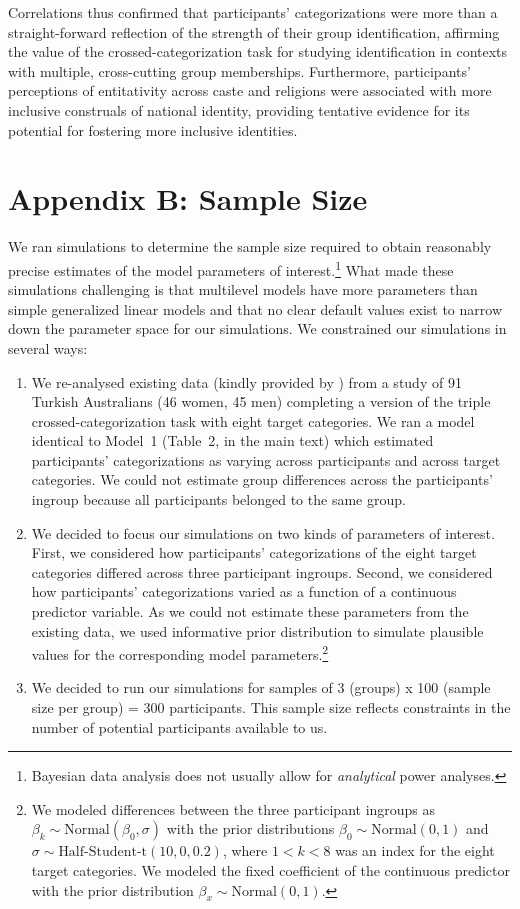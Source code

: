 \documentclass[12pt, a4paper]{article}
\begin{document}
Correlations thus confirmed that participants' categorizations were more than a straight-forward reflection of the strength of their group identification, affirming the value of the crossed-categorization task for studying identification in contexts with multiple, cross-cutting group memberships. Furthermore, participants' perceptions of entitativity across caste and religions were associated with more inclusive construals of national identity, providing tentative evidence for its potential for fostering more inclusive identities.

\newpage

\section{Appendix B: Sample Size}

We ran simulations to determine the sample size required to obtain reasonably precise estimates of the model parameters of interest.\footnote{Bayesian data analysis does not usually allow for \textit{analytical} power analyses.} What made these simulations challenging is that multilevel models have more parameters than simple generalized linear models and that no clear default values exist to narrow down the parameter space for our simulations. We constrained our simulations in several ways:

\begin{enumerate}
\item We re-analysed existing data (kindly provided by ) from a study of 91 Turkish Australians (46 women, 45 men) completing a version of the triple crossed-categorization task with eight target categories. We ran a model identical to Model~1 (Table~2, in the main text) which estimated participants' categorizations as varying across participants and across target categories. We could not estimate group differences across the participants' ingroup because all participants belonged to the same group.
\item We decided to focus our simulations on two kinds of parameters of interest. First, we considered how participants' categorizations of the eight target categories differed across three participant ingroups. Second, we considered how participants' categorizations varied as a function of a continuous predictor variable. As we could not estimate these parameters from the existing data, we used informative prior distribution to simulate plausible values for the corresponding model parameters.\footnote{We modeled differences between the three participant ingroups as $\beta_k \sim \text{Normal}(\beta_0, \sigma)$ with the prior distributions $\beta_0 \sim \text{Normal}(0, 1)$ and $\sigma \sim \text{Half-Student-t}(10, 0, 0.2)$, where $1 < k < 8$ was an index for the eight target categories. We modeled the fixed coefficient of the continuous predictor with the prior distribution $\beta_x \sim \text{Normal}(0, 1)$.}
\item We decided to run our simulations for samples of 3 (groups) x 100 (sample size per group) = 300 participants. This sample size reflects constraints in the number of potential participants available to us.
\end{enumerate}
\end{document}
